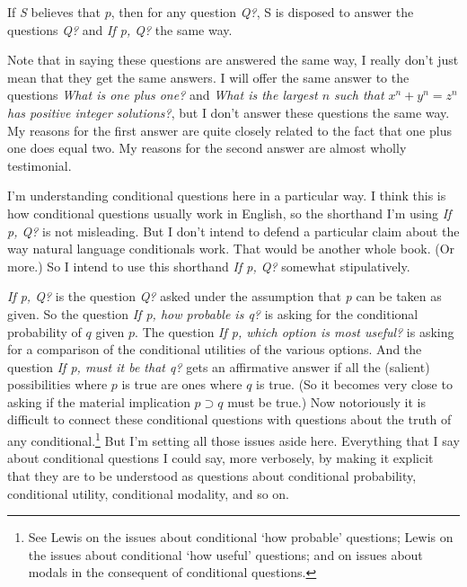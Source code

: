 \documentclass[11pt,]{book}
\providecommand{\tightlist}{%
  \setlength{\itemsep}{0pt}\setlength{\parskip}{0pt}}
\let\rmarkdownfootnote\footnote%
\def\footnote{\protect\rmarkdownfootnote}
\begin{document}
\begin{description}
\tightlist
\item[Unrestricted Conditional Questions]
If \emph{S} believes that \(p\), then for any question \emph{Q?}, S is disposed to answer the questions \emph{Q?} and \emph{If p, Q?} the same way.
\end{description}

Note that in saying these questions are answered the same way, I really don't just mean that they get the same answers. I will offer the same answer to the questions \emph{What is one plus one?} and \emph{What is the largest \(n\) such that \(x^n + y^n = z^n\) has positive integer solutions?}, but I don't answer these questions the same way. My reasons for the first answer are quite closely related to the fact that one plus one does equal two. My reasons for the second answer are almost wholly testimonial.

I'm understanding conditional questions here in a particular way. I think this is how conditional questions usually work in English, so the shorthand I'm using \emph{If p, Q?} is not misleading. But I don't intend to defend a particular claim about the way natural language conditionals work. That would be another whole book. (Or more.) So I intend to use this shorthand \emph{If p, Q?} somewhat stipulatively.

\emph{If p, Q?} is the question \emph{Q?} asked under the assumption that \emph{p} can be taken as given. So the question \emph{If p, how probable is q?} is asking for the conditional probability of \(q\) given \(p\). The question \emph{If p, which option is most useful?} is asking for a comparison of the conditional utilities of the various options. And the question \emph{If p, must it be that q?} gets an affirmative answer if all the (salient) possibilities where \(p\) is true are ones where \(q\) is true. (So it becomes very close to asking if the material implication \(p \supset q\) must be true.) Now notoriously it is difficult to connect these conditional questions with questions about the truth of any conditional.\footnote{See Lewis \citetext{\citeyear{Lewis1976b}; \citeyear{Lewis1986h}} on the issues about conditional `how probable' questions; Lewis \citetext{\citeyear{Lewis1988}; \citeyear{Lewis1996}} on the issues about conditional `how useful' questions; and \citet{Gillies2010} on issues about modals in the consequent of conditional questions.} But I'm setting all those issues aside here. Everything that I say about conditional questions I could say, more verbosely, by making it explicit that they are to be understood as questions about conditional probability, conditional utility, conditional modality, and so on.
\end{document}
